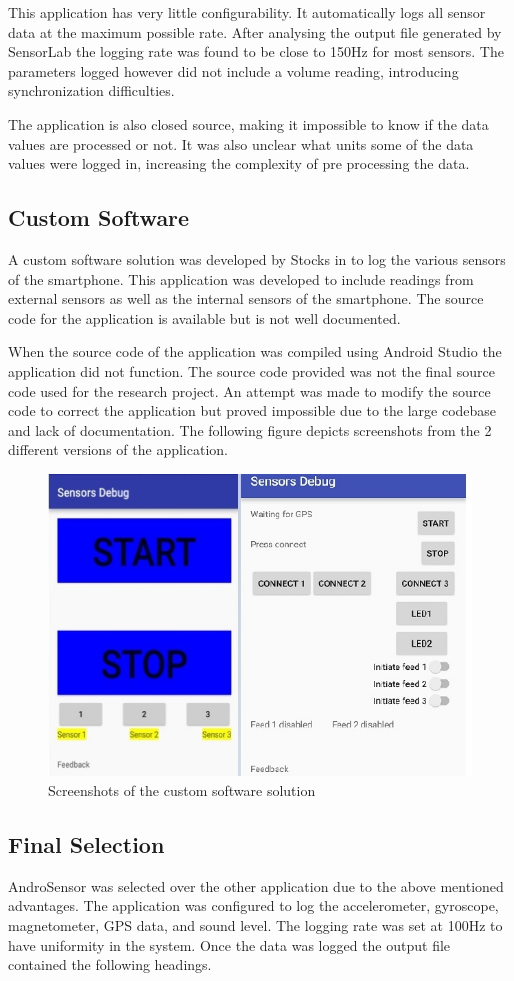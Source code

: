 This application has very little configurability. It automatically logs all sensor data at the maximum possible rate. After analysing the output file generated by SensorLab the logging rate was found to be close to 150Hz for most sensors. The parameters logged however did not include a volume reading, introducing synchronization difficulties.

The application is also closed source, making it impossible to know if the data values are processed or not. It was also unclear what units some of the data values were logged in, increasing the complexity of pre processing the data.

\subsection{Custom Software}
A custom software solution was developed by Stocks in \cite{bradstocks} to log the various sensors of the smartphone. This application was developed to include readings from external sensors as well as the internal sensors of the smartphone. The source code for the application is available but is not well documented.

When the source code of the application was compiled using Android Studio the application did not function. The source code provided was not the final source code used for the research project. An attempt was made to modify the source code to correct the application but proved impossible due to the large codebase and lack of documentation. The following figure depicts screenshots from the 2 different versions of the application.

\begin{figure}[!ht] 
\captionsetup{width=0.8\linewidth, font=small}  
\includegraphics[width=0.6\linewidth]{figures/bradbadcode.jpg}
\caption{Screenshots of the custom software solution}
\label{fig:bradbadcode}
\end{figure}


\subsection{Final Selection}
AndroSensor was selected over the other application due to the above mentioned advantages. The application was configured to log the accelerometer, gyroscope, magnetometer, GPS data, and sound level. The logging rate was set at 100Hz to have uniformity in the system. Once the data was logged the output file contained the following headings. 

